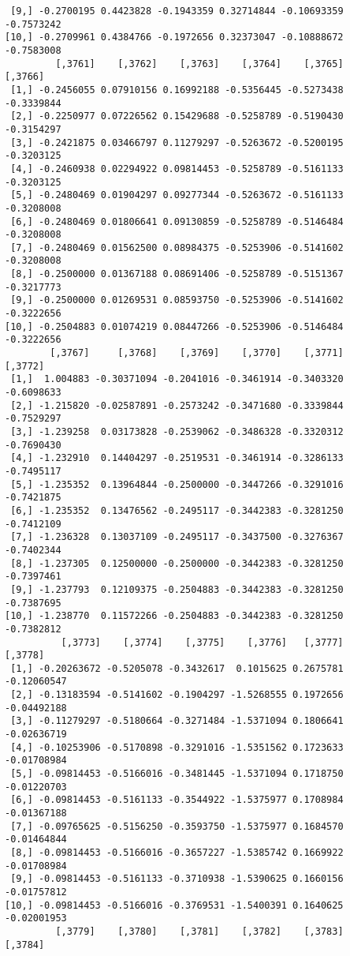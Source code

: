 \documentclass[
  letterpaper,
  DIV=11,
  numbers=noendperiod]{scrreprt}
\begin{document}
\begin{verbatim}
 [9,] -0.2700195 0.4423828 -0.1943359 0.32714844 -0.10693359 -0.7573242
[10,] -0.2709961 0.4384766 -0.1972656 0.32373047 -0.10888672 -0.7583008
         [,3761]    [,3762]    [,3763]    [,3764]    [,3765]    [,3766]
 [1,] -0.2456055 0.07910156 0.16992188 -0.5356445 -0.5273438 -0.3339844
 [2,] -0.2250977 0.07226562 0.15429688 -0.5258789 -0.5190430 -0.3154297
 [3,] -0.2421875 0.03466797 0.11279297 -0.5263672 -0.5200195 -0.3203125
 [4,] -0.2460938 0.02294922 0.09814453 -0.5258789 -0.5161133 -0.3203125
 [5,] -0.2480469 0.01904297 0.09277344 -0.5263672 -0.5161133 -0.3208008
 [6,] -0.2480469 0.01806641 0.09130859 -0.5258789 -0.5146484 -0.3208008
 [7,] -0.2480469 0.01562500 0.08984375 -0.5253906 -0.5141602 -0.3208008
 [8,] -0.2500000 0.01367188 0.08691406 -0.5258789 -0.5151367 -0.3217773
 [9,] -0.2500000 0.01269531 0.08593750 -0.5253906 -0.5141602 -0.3222656
[10,] -0.2504883 0.01074219 0.08447266 -0.5253906 -0.5146484 -0.3222656
        [,3767]     [,3768]    [,3769]    [,3770]    [,3771]    [,3772]
 [1,]  1.004883 -0.30371094 -0.2041016 -0.3461914 -0.3403320 -0.6098633
 [2,] -1.215820 -0.02587891 -0.2573242 -0.3471680 -0.3339844 -0.7529297
 [3,] -1.239258  0.03173828 -0.2539062 -0.3486328 -0.3320312 -0.7690430
 [4,] -1.232910  0.14404297 -0.2519531 -0.3461914 -0.3286133 -0.7495117
 [5,] -1.235352  0.13964844 -0.2500000 -0.3447266 -0.3291016 -0.7421875
 [6,] -1.235352  0.13476562 -0.2495117 -0.3442383 -0.3281250 -0.7412109
 [7,] -1.236328  0.13037109 -0.2495117 -0.3437500 -0.3276367 -0.7402344
 [8,] -1.237305  0.12500000 -0.2500000 -0.3442383 -0.3281250 -0.7397461
 [9,] -1.237793  0.12109375 -0.2504883 -0.3442383 -0.3281250 -0.7387695
[10,] -1.238770  0.11572266 -0.2504883 -0.3442383 -0.3281250 -0.7382812
          [,3773]    [,3774]    [,3775]    [,3776]   [,3777]     [,3778]
 [1,] -0.20263672 -0.5205078 -0.3432617  0.1015625 0.2675781 -0.12060547
 [2,] -0.13183594 -0.5141602 -0.1904297 -1.5268555 0.1972656 -0.04492188
 [3,] -0.11279297 -0.5180664 -0.3271484 -1.5371094 0.1806641 -0.02636719
 [4,] -0.10253906 -0.5170898 -0.3291016 -1.5351562 0.1723633 -0.01708984
 [5,] -0.09814453 -0.5166016 -0.3481445 -1.5371094 0.1718750 -0.01220703
 [6,] -0.09814453 -0.5161133 -0.3544922 -1.5375977 0.1708984 -0.01367188
 [7,] -0.09765625 -0.5156250 -0.3593750 -1.5375977 0.1684570 -0.01464844
 [8,] -0.09814453 -0.5166016 -0.3657227 -1.5385742 0.1669922 -0.01708984
 [9,] -0.09814453 -0.5161133 -0.3710938 -1.5390625 0.1660156 -0.01757812
[10,] -0.09814453 -0.5166016 -0.3769531 -1.5400391 0.1640625 -0.02001953
         [,3779]    [,3780]    [,3781]    [,3782]    [,3783]    [,3784]

\end{verbatim}
\end{document}
